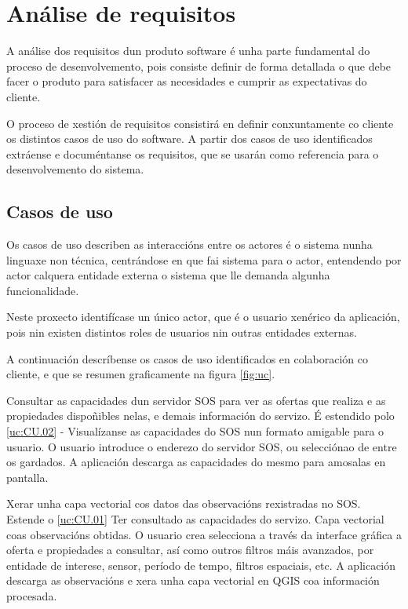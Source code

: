 \chapter{Análise de requisitos}

A análise dos requisitos dun produto software é unha parte fundamental do proceso de desenvolvemento, pois consiste definir de forma detallada o que debe facer o produto para satisfacer as necesidades e cumprir as expectativas do cliente.

O proceso de xestión de requisitos\cite{GPGR} consistirá en definir conxuntamente co cliente os distintos casos de uso do software. A partir dos casos de uso identificados extráense e documéntanse os requisitos, que se usarán como referencia para o desenvolvemento do sistema.

\section{Casos de uso}

Os casos de uso\cite{UseCase} describen as interaccións entre os actores é o sistema nunha linguaxe non técnica, centrándose en que fai sistema para o actor, entendendo por actor calquera entidade externa o sistema que lle demanda algunha funcionalidade.

Neste proxecto identifícase un único actor, que é o usuario xenérico da aplicación, pois nin existen distintos roles de usuarios nin outras entidades externas.

A continuación descríbense os casos de uso identificados en colaboración co cliente, e que se resumen graficamente na figura \ref{fig:uc}.

			{Consultar as capacidades dun servidor SOS para ver as ofertas que realiza e as propiedades dispoñibles nelas, e demais información do servizo.} %
			{É estendido polo \ref{uc:CU.02}} %
			{-} %
			{Visualízanse as capacidades do SOS nun formato amigable para o usuario.} %
			{O usuario introduce o enderezo do servidor SOS, ou selecciónao de entre os gardados. A aplicación descarga as capacidades do mesmo para amosalas en pantalla. 
			} %
			
			{Xerar unha capa vectorial cos datos das observacións rexistradas no SOS.} %
			{Estende o \ref{uc:CU.01}} %
			{Ter consultado as capacidades do servizo.} %
			{Capa vectorial coas observacións obtidas.} %
			{O usuario crea selecciona a través da interface gráfica a oferta e propiedades a consultar, así como outros filtros máis avanzados, por entidade de interese, sensor, período de tempo, filtros espaciais, etc. A aplicación descarga as observacións e xera unha capa vectorial en QGIS coa información procesada.
			} %

